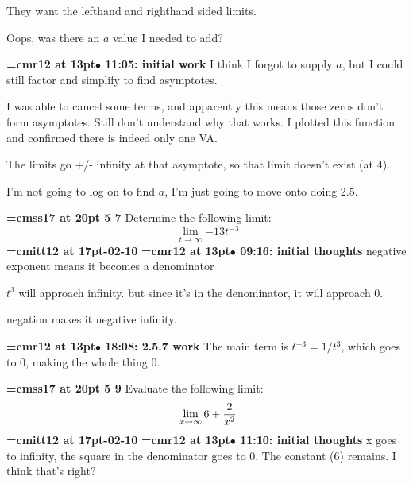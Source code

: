 They want the lefthand and righthand sided limits.
\par

Oops, was there an $a$ value I needed to add?
\par

{\smallskip\noindent\bf\font\titlefont=cmr12 at 13pt\titlefont $\bullet$ 11:05: initial work}\smallskip
I think I forgot to supply $a$, but I could still factor and simplify to find asymptotes.
\par

I was able to cancel some terms, and apparently this means those zeros don't form asymptotes. Still don't understand why that works. I plotted this function and confirmed there is indeed only one VA.
\par

The limits go +/- infinity at that asymptote, so that limit doesn't exist (at 4).
\par

I'm not going to log on to find $a$, I'm just going to move onto doing 2.5.
\par

{\medskip\noindent\bf\font\titlefont=cmss17 at 20pt 5 7}\medskip
Determine the following limit:
$$\
\lim_{t \to \infty}{
-13t^{-3}
}
$$
{\medskip\noindent\bf\font\titlefont=cmitt12 at 17pt-02-10}\medskip
{\smallskip\noindent\bf\font\titlefont=cmr12 at 13pt\titlefont $\bullet$ 09:16: initial thoughts}\smallskip
negative exponent means it becomes a denominator
\par

$t^3$ will approach infinity. but since it's in the denominator, it will approach 0.
\par

negation makes it negative infinity.
\par

{\smallskip\noindent\bf\font\titlefont=cmr12 at 13pt\titlefont $\bullet$ 18:08: 2.5.7 work}\smallskip
The main term is $t^{-3} = 1/t^3$, which goes to 0, making the whole thing 0.
\par

{\medskip\noindent\bf\font\titlefont=cmss17 at 20pt 5 9}\medskip
Evaluate the following limit:
$$\
\lim_{x \to \infty}{
6 + {2 \over x^2}
}
$$
{\medskip\noindent\bf\font\titlefont=cmitt12 at 17pt-02-10}\medskip
{\smallskip\noindent\bf\font\titlefont=cmr12 at 13pt\titlefont $\bullet$ 11:10: initial thoughts}\smallskip
x goes to infinity, the square in the denominator goes to 0. The constant (6) remains. I think that's right?
\par


